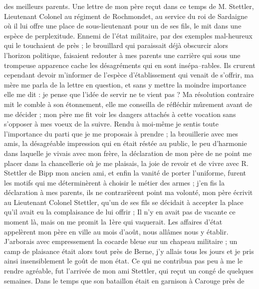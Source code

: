\documentclass[12pt]{article}
\begin{document}
 des meilleurs parents. Une lettre de mon père reçut dans
ce temps de M. Stettler, Lieutenant Colonel au régiment de Rochmondet, au service du roi de
Sardaigne où il lui offre une place de sous-lieutenant pour un de ses fils, le mit dans une espèce
de perplexitude. Ennemi de l’état militaire, par des exemples mal-heureux qui le touchaient de près
; le brouillard qui paraissait déjà obscurcir alors l’horizon politique, faisaient redouter à mes
parents une carrière qui sous une trompeuse apparence cache les désagréments qui en sont
insépa–rables. Ils crurent cependant devoir m’informer de l’espèce d’établissement qui venait de
s’offrir, ma mère me parla de la lettre en question, et sans y mettre la moindre importance elle me
dit : je pense que l’idée de servir ne te vient pas ? Ma résolution contraire mit le comble à son
étonnement, elle me conseilla de réfléchir mûrement avant de me décider ; mon père me fit voir les
dangers attachés à cette vocation sans s’opposer à mes voeux de la suivre. Rendu à moi-même je
sentis toute l’importance du parti que je me proposais à prendre ; la brouillerie avec mes amis, la
désagréable impression qui en était réstée au public, le peu d’harmonie dans laquelle je vivais avec
mon frère, la déclaration de mon père de ne point me placer dans la chancellerie où je me plaisais,
la joie de revoir et de vivre avec R. Stettler de Bipp mon ancien ami, et enfin la vanité de porter
l’uniforme, furent les motifs qui me déterminèrent à choisir le métier des armes ; j’en fis la
déclaration à mes parents, ils ne contrarièrent point ma volonté, mon père écrivit au Lieutenant
Colonel Stettler, qu’un de ses fils se décidait à accepter la place qu’il avait eu la complaisance
de lui offrir ; Il n’y en avait pas de vacante ce moment là, mais on me promit la 1ère qui
vaquerait. Les affaires d’état appelèrent mon père en ville au mois d’août, nous allâmes nous y
établir. J’arborais avec empressement la cocarde bleue sur un chapeau militaire ; un camp de
plaisance était alors tout près de Berne, j’y allais tous les jours et je pris ainsi insensiblement
le goût de mon état. Ce qui ne contribua pas peu à me le rendre agréable, fut l’arrivée de mon ami
Stettler, qui reçut un congé de quelques semaines. Dans le temps que son bataillon était en garnison
à Carouge près de
\end{document}
